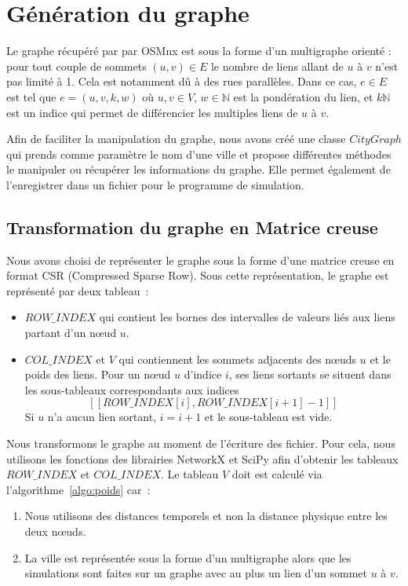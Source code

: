 \section{Génération du graphe}\label{sec:graphe}
Le graphe récupéré par par OSMnx est sous la forme d'un multigraphe orienté : pour tout couple de sommets $(u,v)\in E$ le nombre de liens allant de $u$ à $v$ n'est pas limité à 1. Cela est notamment dû à des rues parallèles. Dans ce cas, $e\in E$ est tel que $e=(u,v,k,w)$ où $u,v\in V$, $w\in\mathbb{N}$ est la pondération du lien, et $k\mathbb{N}$ est un indice qui permet de différencier les multiples liens de $u$ à $v$.
	
Afin de faciliter la manipulation du graphe, nous avons créé une classe $CityGraph$ qui prends comme paramètre le nom d'une ville et propose différentes méthodes le manipuler ou récupérer les informations du graphe. Elle permet également de l'enregistrer dans un fichier pour le programme de simulation. 

\subsection{Transformation du graphe en Matrice creuse}
Nous avons choisi de représenter le graphe sous la forme d'une matrice creuse en format CSR (Compressed Sparse Row). Sous cette représentation, le graphe est représenté par deux tableau~: %
\begin{itemize}
	\item $ROW\_INDEX$ qui contient les bornes des intervalles de valeurs liés aux liens partant d'un nœud $u$. %
	\item $COL\_INDEX$ et $V$ qui contiennent les sommets adjacents des nœuds $u$ et le poids des liens. Pour un nœud $u$ d'indice $i$, ses liens sortants se situent dans les sous-tableaux correspondants aux indices
	\[[\![ROW\_INDEX[i],ROW\_INDEX[i+1]-1]\!]\]
	Si $u$ n'a aucun lien sortant, $i=i+1$ et le sous-tableau est vide.
\end{itemize}
Nous transformons le graphe au moment de l'écriture des fichier. Pour cela, nous utilisons les fonctions des librairies NetworkX et SciPy %
	afin d'obtenir les tableaux $ROW\_INDEX$ et $COL\_INDEX$. Le tableau $V$ doit est calculé via l'algorithme~\ref{algo:poids} car~: \begin{enumerate}
	\item Nous utilisons des distances temporels et non la distance physique entre les deux nœuds. %
	\item La ville est représentée sous la forme d'un multigraphe alors que les simulations sont faites sur un graphe avec au plus un lien d'un sommet $u$ à $v$.
\end{enumerate}

